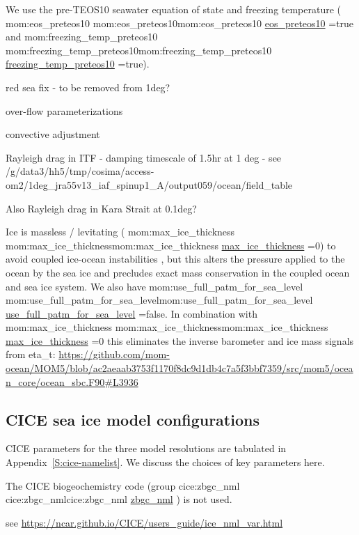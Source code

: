 \documentclass[11pt]{article}
\makeatletter
\newcommand*{\make@hex@label}[1]{%
  \def\hex@label{#1}%
  \@onelevel@sanitize\hex@label
  \EdefEscapeHex\hex@label{\hex@label}%
}
\newcommand*{\hexhyperlink}[2]{%
  \make@hex@label{#1}%
  \hyperlink{\hex@label}{#2}%
}
\newcommand{\momlink}[2]{\hexhyperlink{mom:#2}{#1}}
\newcommand{\cicelink}[2]{\hexhyperlink{cice:#2}{#1}}
\newcommand{\param}[1]{\textsf{#1}}
\newcommand{\mom}[1]{\param{\momlink{#1}{#1}}}
\newcommand{\cice}[1]{\param{\cicelink{#1}{#1}}}
\makeatother
\begin{document}
We use the \citet{JackettMcDougallFeistelWrightGriffies2006a} pre-TEOS10 seawater equation of state and freezing temperature (\mom{eos_preteos10}=true and \mom{freezing_temp_preteos10}=true).

red sea fix - to be removed from 1deg?

over-flow parameterizations

convective adjustment

Rayleigh drag in ITF - damping timescale of 1.5hr at 1 deg
- see /g/data3/hh5/tmp/cosima/access-om2/1deg_jra55v13_iaf_spinup1_A/output059/ocean/field_table

Also Rayleigh drag in Kara Strait at 0.1deg?

Ice is massless / levitating (\mom{max_ice_thickness}=0) to avoid coupled ice-ocean instabilities \citep{Hallberg2014a}, but this alters the pressure applied to the ocean by the sea ice and precludes exact mass conservation in the coupled ocean and sea ice system.
We also have \mom{use_full_patm_for_sea_level}=false. In combination with \mom{max_ice_thickness}=0 this eliminates the inverse barometer and ice mass signals from eta_t:
\url{https://github.com/mom-ocean/MOM5/blob/ac2aeaab3753f1170f8dc9d1db4c7a5f3bbf7359/src/mom5/ocean_core/ocean_sbc.F90#L3936}
%

\subsection{CICE sea ice model configurations}
CICE parameters for the three model resolutions are tabulated in Appendix~\ref{S:cice-namelist}.
We discuss the choices of key parameters here.

The CICE biogeochemistry code (group \cice{zbgc_nml}) is not used.

see \url{https://ncar.github.io/CICE/users_guide/ice_nml_var.html}
\end{document}
